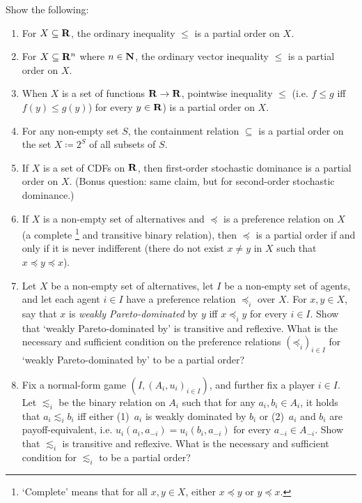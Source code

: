 \begin{exercise}
	\label{exercise:partial_orders}
	Show the following:
	\begin{enumerate}[label=(\alph*)]
	
		\item For $X \subseteq \mathbf{R}$, the ordinary inequality $\leq$ is a partial order on $X$.

		\item For $X \subseteq \mathbf{R}^n$ where $n \in \mathbf{N}$, the ordinary vector inequality $\leq$ is a partial order on $X$.

		\item When $X$ is a set of functions $\mathbf{R} \to \mathbf{R}$, pointwise inequality $\leq$ (i.e. $f \leq g$ iff $f(y) \leq g(y)$) for every $y \in \mathbf{R}$) is a partial order on $X$.

		\item For any non-empty set $S$, the containment relation $\subseteq$ is a partial order on the set $X \coloneqq 2^S$ of all subsets of $S$.

		\item \label{item:partial_orders:fosd} If $X$ is a set of CDFs on $\mathbf{R}$, then first-order stochastic dominance is a partial order on $X$. (Bonus question: same claim, but for second-order stochastic dominance.)

		\item \label{item:posets:pref} If $X$ is a non-empty set of alternatives and $\preceq$ is a preference relation on $X$ (a complete%
			\footnote{`Complete' means that for all $x,y \in X$, either $x \preceq y$ or $y \preceq x$.}
		and transitive binary relation), then $\preceq$ is a partial order if and only if it is never indifferent (there do not exist $x \neq y$ in $X$ such that $x \preceq y \preceq x$).

		\item Let $X$ be a non-empty set of alternatives, let $I$ be a non-empty set of agents, and let each agent $i \in I$ have a preference relation $\preceq_i$ over $X$. For $x,y \in X$, say that $x$ is \emph{weakly Pareto-dominated} by $y$ iff $x \preceq_i y$ for every $i \in I$. Show that `weakly Pareto-dominated by' is transitive and reflexive. What is the necessary and sufficient condition on the preference relations $(\mathord{\preceq}_i)_{i \in I}$ for `weakly Pareto-dominated by' to be a partial order?

		\item Fix a normal-form game $(I,(A_i,u_i)_{i \in I})$, and further fix a player $i \in I$. Let $\lesssim_i$ be the binary relation on $A_i$ such that for any $a_i, b_i \in A_i$, it holds that $a_i \lesssim_i b_i$ iff either (1)~$a_i$ is weakly dominated by $b_i$ or (2)~$a_i$ and $b_i$ are payoff-equivalent, i.e. $u_i(a_i,a_{-i}) = u_i(b_i,a_{-i})$ for every $a_{-i} \in A_{-i}$. Show that $\lesssim_i$ is transitive and reflexive. What is the necessary and sufficient condition for $\lesssim_i$ to be a partial order?
	
	\end{enumerate}
\end{exercise}

